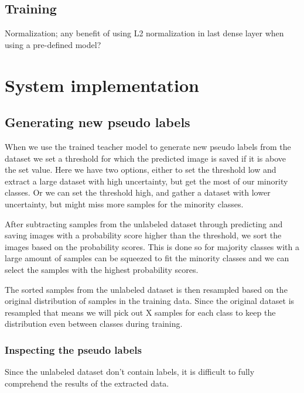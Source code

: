 \documentclass[thesis.tex]{subfiles}
\begin{document}
\subsection{Training}
Normalization; any benefit of using L2 normalization in last dense layer when using a pre-defined model?



\section{System implementation} \label{sec:system_implementation}


\subsection{Generating new pseudo labels}
When we use the trained teacher model to generate new pseudo labels from the dataset we set a threshold for which the predicted image is saved if it is above the set value. Here we have two options, either to set the threshold low and extract a large dataset with high uncertainty, but get the most of our minority classes. Or we can set the threshold high, and gather a dataset with lower uncertainty, but might miss more samples for the minority classes.

After subtracting samples from the unlabeled dataset through predicting and saving images with a probability score higher than the threshold, we sort the images based on the probability scores. This is done so for majority classes with a large amount of samples can be squeezed to fit the minority classes and we can select the samples with the highest probability scores.

The sorted samples from the unlabeled dataset is then resampled based on the original distribution of samples in the training data. Since the original dataset is resampled that means we will pick out X samples for each class to keep the distribution even between classes during training.

\subsubsection{Inspecting the pseudo labels}
Since the unlabeled dataset don't contain labels, it is difficult to fully comprehend the results of the extracted data.
\end{document}
